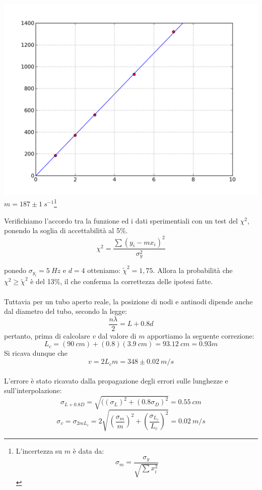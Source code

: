 \begin{center}
\includegraphics[scale=0.5]{../grafici/tubo/tubo1.png}
$m = 187\pm 1\ s^{-1}$\hspace{1cm}\footnote{L'incertezza su $m$ è data da: $$\sigma_m=\frac{\sigma_y}{\sqrt{\sum{x_i^2}}}$$}
\end{center}

Verifichiamo l'accordo tra la funzione ed i dati sperimentiali con un test del $\chi^2$, ponendo la soglia di accettabilità al 5\%.
\begin{equation}\label{chi2}
\chi^2=\displaystyle{\frac{\sum{(y_i-mx_i)^2}}{\sigma_{y}^2}}
\end{equation}

ponedo $\sigma_{y_i}=5\ Hz$ e $d=4$ otteniamo: $\tilde{\chi}^2=1,75$. Allora la probabilità che $\chi^2\geq\tilde{\chi}^2$ è del 13\%, il che conferma la correttezza delle ipotesi fatte.\\
\\
Tuttavia per un tubo aperto reale, la posizione di nodi e antinodi dipende anche dal diametro del tubo, secondo la legge:
$$\frac{n\lambda}{2}=L+0.8d$$ pertanto, prima di calcolare $v$ dal valore di $m$ apportiamo la seguente correzione:
$$ L_c = (90\ cm)+(0.8)(3.9\ cm) = 93.12\ cm = 0.93 m $$
Si ricava dunque che $$v=2L_cm=348\pm0.02\ m/s$$
\\
L'errore è stato ricavato dalla propagazione degli errori sulle lunghezze e sull'interpolazione:
$$\sigma_{L+0.8D}=\sqrt{((\sigma_L)^2+(0.8\sigma_D)^2}=0.55\ cm$$
$$\sigma_v= \sigma_{2mL_c}= 2\sqrt{\left(\frac{\sigma_m}{m}\right)^2+\left(\frac{\sigma_{L_{c}}}{L_c}\right)^2}= 0.02\ m/s$$


